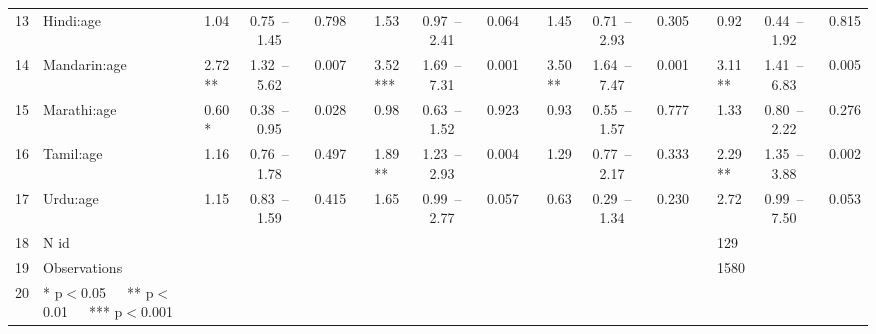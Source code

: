 \begin{table}[ht]
\begin{tabular}{}
  13 & Hindi:age & 1.04 & 0.75 – 1.45 & 0.798 &  & 1.53 & 0.97 – 2.41 & 0.064 &  & 1.45 & 0.71 – 2.93 & 0.305 &  & 0.92 & 0.44 – 1.92 & 0.815 \\ 
  14 & Mandarin:age & 2.72 ** & 1.32 – 5.62 & 0.007 &  & 3.52 *** & 1.69 – 7.31 & 0.001 &  & 3.50 ** & 1.64 – 7.47 & 0.001 &  & 3.11 ** & 1.41 – 6.83 & 0.005 \\ 
  15 & Marathi:age & 0.60 * & 0.38 – 0.95 & 0.028 &  & 0.98 & 0.63 – 1.52 & 0.923 &  & 0.93 & 0.55 – 1.57 & 0.777 &  & 1.33 & 0.80 – 2.22 & 0.276 \\ 
  16 & Tamil:age & 1.16 & 0.76 – 1.78 & 0.497 &  & 1.89 ** & 1.23 – 2.93 & 0.004 &  & 1.29 & 0.77 – 2.17 & 0.333 &  & 2.29 ** & 1.35 – 3.88 & 0.002 \\ 
  17 & Urdu:age & 1.15 & 0.83 – 1.59 & 0.415 &  & 1.65 & 0.99 – 2.77 & 0.057 &  & 0.63 & 0.29 – 1.34 & 0.230 &  & 2.72 & 0.99 – 7.50 & 0.053 \\ 
  18 & N id &  &  &  &  &  &  &  &  &  &  &  &  & 129 &  &  \\ 
  19 & Observations &  &  &  &  &  &  &  &  &  &  &  &  & 1580 &  &  \\ 
  20 & * p$<$0.05   ** p$<$0.01   *** p$<$0.001 &  &  &  &  &  &  &  &  &  &  &  &  &  &  &  \\ 
   \hline
\end{tabular}
\end{table}
